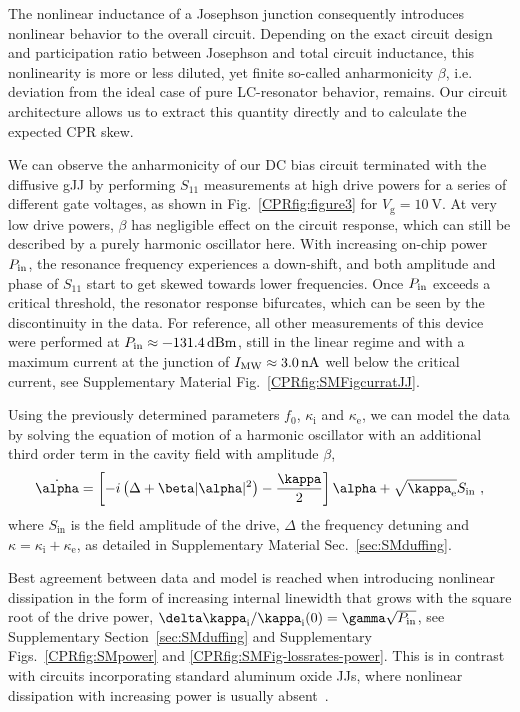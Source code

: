 The nonlinear inductance of a Josephson junction consequently introduces nonlinear behavior to the overall circuit.
%
Depending on the exact circuit design and participation ratio between Josephson and total circuit inductance, this nonlinearity is more or less diluted, yet finite so-called anharmonicity $\beta$, i.e. deviation from the ideal case of pure LC-resonator behavior, remains.
%
Our circuit architecture allows us to extract this quantity directly and to calculate the expected CPR skew.

We can observe the anharmonicity of our DC bias circuit terminated with the diffusive gJJ by performing $S_{11}$ measurements at high drive powers for a series of different gate voltages, as shown in Fig.~\ref{CPRfig:figure3} for $V_\text{g}=\SI{+10}{\volt}$.
%
At very low drive powers, $\beta$ has negligible effect on the circuit response, which can still be described by a purely harmonic oscillator here.
%
With increasing on-chip power $P_{\rm in}$, the resonance frequency experiences a down-shift, and both amplitude and phase of $S_{11}$ start to get skewed towards lower frequencies.
%
Once $P_{\rm in}$ exceeds a critical threshold, the resonator response bifurcates, which can be seen by the discontinuity in the data.
%
For reference, all other measurements of this device were performed at $P_{\rm in}\approx\SI{-131.4}{dBm}$, still in the linear regime and with a maximum current at the junction of $I_{\rm MW}\approx\SI{3.0}{\nano\ampere}$ well below the critical current, see Supplementary Material Fig.~\ref{CPRfig:SMFigcurratJJ}.

Using the previously determined parameters $f_0$, $\kappa_\text{i}$ and $\kappa_\text{e}$, we can model the data by solving the equation of motion of a harmonic oscillator with an additional third order term in the cavity field with amplitude $\beta$, 
%
\begin{align}
\dot{\alpha} = \left[ -i \left( \Delta+\beta\abs{\alpha}^2 \right)-\frac{\kappa}{2} \right]\alpha + \sqrt{\kappa_\text{e}} S_\text{in}\ ,
\label{CPReq:Duffing-EOM}
\end{align}
%
where $S_\text{in}$ is the field amplitude of the drive, $\Delta$ the frequency detuning and $\kappa=\kappa_\text{i}+\kappa_\text{e}$, as detailed in Supplementary Material Sec.~\ref{sec:SMduffing}.


Best agreement between data and model is reached when introducing nonlinear dissipation in the form of increasing internal linewidth that grows with the square root of the drive power, $\delta\kappa_\text{i}/\kappa_\text{i}(0)=\gamma \sqrt{P_{\rm in}}$, see Supplementary Section~\ref{sec:SMduffing} and Supplementary Figs.~\ref{CPRfig:SMpower} and \ref{CPRfig:SMFig-lossrates-power}.
%
This is in contrast with circuits incorporating standard aluminum oxide JJs, where nonlinear dissipation with increasing power is usually absent~\cite{boakninDispersiveMicrowaveBifurcation2007b}.

